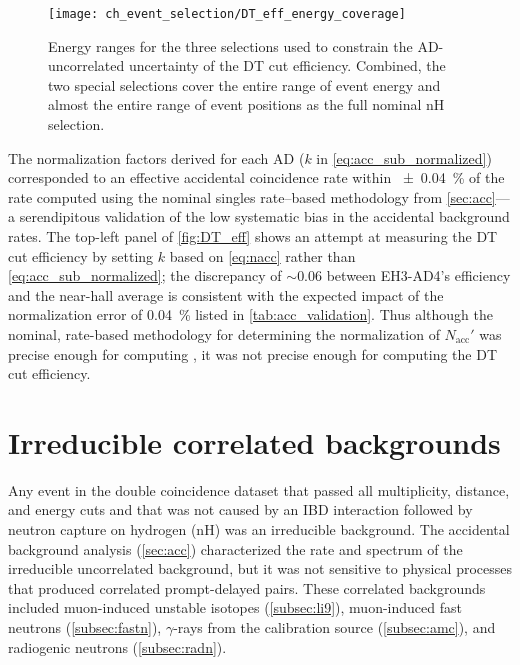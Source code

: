 \begin{figure}
    \centering
    \texttt{[image: ch\_event\_selection/DT\_eff\_energy\_coverage]}
    \caption[DT efficiency study energy coverage]{
        Energy ranges for the three selections used to constrain
        the AD-uncorrelated uncertainty of the DT cut efficiency.
        Combined, the two special selections cover the entire range of event energy
        and almost the entire range of event positions
        as the full nominal nH selection.
    }
    \label{fig:DT_energy_range}
\end{figure}

The normalization factors derived for each AD ($k$ in \cref{eq:acc_sub_normalized})
corresponded to an effective accidental coincidence rate
within \SI{\pm0.04}{\percent} of the rate computed
using the nominal singles rate--based methodology from \cref{sec:acc}---%
a serendipitous validation of the low systematic bias
in the accidental background rates.
The top-left panel of \cref{fig:DT_eff} shows an attempt
at measuring the DT cut efficiency by setting $k$ based on \cref{eq:nacc}
rather than \cref{eq:acc_sub_normalized};
the discrepancy of ${\sim}0.06$ between EH3-AD4's efficiency and the near-hall average
is consistent with the expected impact
of the normalization error of \SI{0.04}{\percent} listed in \cref{tab:acc_validation}.
Thus although the nominal, rate-based methodology
for determining the normalization of $N_\text{acc}'$
was precise enough
for computing \thetaot{},
it was not precise enough for computing the DT cut efficiency.

\section{Irreducible correlated backgrounds}
\label{sec:correlated_bg}

Any event in the double coincidence dataset
that passed all multiplicity, distance, and energy cuts
and that was not caused by an IBD interaction followed by
neutron capture on hydrogen (nH)
was an irreducible background.
The accidental background analysis (\cref{sec:acc})
characterized the rate and spectrum of
the irreducible uncorrelated background,
but it was not sensitive to physical processes that produced
correlated prompt-delayed pairs.
These correlated backgrounds included muon-induced unstable isotopes (\cref{subsec:li9}),
muon-induced fast neutrons (\cref{subsec:fastn}),
$\gamma$-rays from the \amc{} calibration source (\cref{subsec:amc}),
and radiogenic neutrons (\cref{subsec:radn}).

